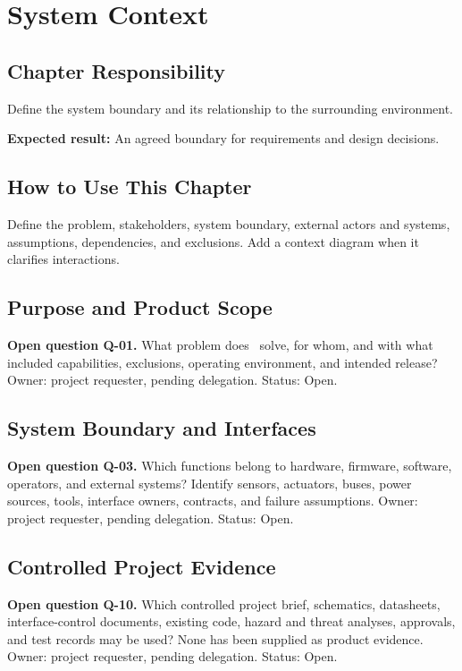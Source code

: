\chapter{System Context}
\section{Chapter Responsibility}
\label{Section:SystemContextResponsibility}
Define the system boundary and its relationship to the surrounding environment.

\noindent\textbf{Expected result:} An agreed boundary for requirements and design decisions.

\section{How to Use This Chapter}
Define the problem, stakeholders, system boundary, external actors and systems, assumptions, dependencies, and exclusions. Add a context diagram when it clarifies interactions.
\section{Purpose and Product Scope}
\label{Question:Q-01}
\par\noindent\textbf{Open question Q-01.} What problem does \ProjectName\ solve, for whom, and with what included capabilities, exclusions, operating environment, and intended release? Owner: project requester, pending delegation. Status: Open.
\section{System Boundary and Interfaces}
\label{Question:Q-03}
\par\noindent\textbf{Open question Q-03.} Which functions belong to hardware, firmware, software, operators, and external systems? Identify sensors, actuators, buses, power sources, tools, interface owners, contracts, and failure assumptions. Owner: project requester, pending delegation. Status: Open.
\section{Controlled Project Evidence}
\label{Question:Q-10}
\par\noindent\textbf{Open question Q-10.} Which controlled project brief, schematics, datasheets, interface-control documents, existing code, hazard and threat analyses, approvals, and test records may be used? None has been supplied as product evidence. Owner: project requester, pending delegation. Status: Open.
